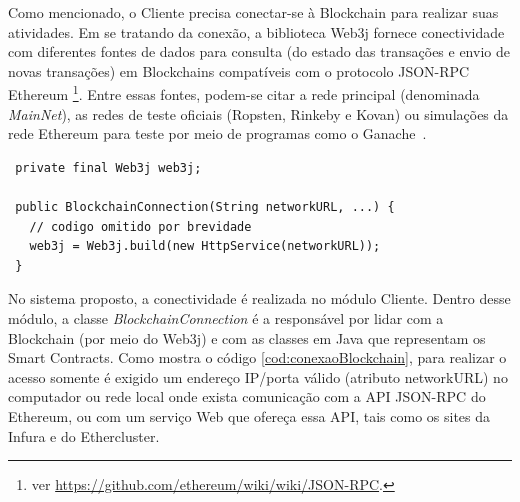 \documentclass[a4paper,11pt]{article}
\begin{document}





Como mencionado, o Cliente precisa conectar-se à Blockchain para realizar suas atividades.
Em se tratando da conexão, a biblioteca Web3j fornece conectividade com diferentes fontes de dados para consulta (do estado das transações e envio de novas transações) em Blockchains compatíveis com o protocolo JSON-RPC Ethereum
\footnote{ver \href{https://github.com/ethereum/wiki/wiki/JSON-RPC}{https://github.com/ethereum/wiki/wiki/JSON-RPC}.}.
Entre essas fontes, podem-se citar a rede principal (denominada \emph{MainNet}), as redes de teste oficiais (Ropsten, Rinkeby e Kovan) ou simulações da rede Ethereum para teste por meio de programas como o Ganache~\cite{ganache}.


\begin{lstlisting}
 private final Web3j web3j;

 public BlockchainConnection(String networkURL, ...) {
   // codigo omitido por brevidade
   web3j = Web3j.build(new HttpService(networkURL));
 }
\end{lstlisting}


No sistema proposto, a conectividade é realizada no módulo Cliente.
Dentro desse módulo, a classe \emph{BlockchainConnection} é a responsável por lidar com a Blockchain (por meio do Web3j) e com as classes em Java que representam os Smart Contracts. Como mostra o código \ref{cod:conexaoBlockchain}, para realizar o acesso  somente é exigido um endereço IP/porta válido (atributo networkURL) no computador ou rede local onde exista comunicação com a API JSON-RPC do Ethereum, ou com um serviço Web que ofereça essa API, tais como os sites da Infura e do Ethercluster.
\end{document}
